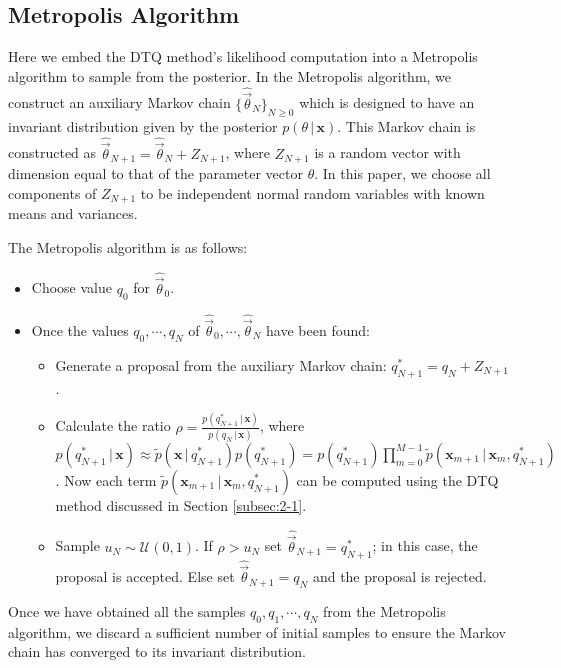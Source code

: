 \documentclass[graybox]{svmult}
\begin{document}
\subsection{Metropolis Algorithm}
\label{subsec:2-2}
Here we embed the DTQ method's likelihood computation into a Metropolis algorithm to sample from the posterior. In the Metropolis algorithm, we construct an auxiliary  Markov chain $\lbrace \hat{\vec{\theta}}_N\rbrace_{N\geq 0}$ which is designed to have an invariant distribution given by the posterior $p(\theta \, | \, \mathbf{x})$. This Markov chain is constructed as $\hat{\vec{\theta}}_{N+1} = \hat{\vec{\theta}}_N + Z_{N+1}$,
where $Z_{N+1}$ is a random vector with dimension equal to that of the parameter vector $\theta$.  In this paper, we choose all components of $Z_{N+1}$ to be independent normal random variables with known means and variances.

The Metropolis algorithm is as follows:
\begin{itemize}
\item Choose value $q_0$ for $\hat{\vec{\theta}}_{0}$.
\item Once the values $q_0, \cdots, q_N$ of $\hat{\vec{\theta}}_{0},\cdots,\hat{\vec{\theta}}_{N}$ have been found:
\begin{itemize}
\item Generate a proposal from the auxiliary Markov chain:
$q_{N+1}^{*} = q_{N} + Z_{N+1}$.
\item Calculate the ratio $\rho = \frac{p(q_{N+1}^{*}  \, | \, \mathbf{x})}{p(q_N \, | \, \mathbf{x})}$, where $p(q_{N+1}^{*}  \, | \, \mathbf{x}) \approx \widetilde{p}(\mathbf{x} \, | \, q_{N+1}^{*}) p(q_{N+1}^{*}) = p(q_{N+1}^{*}) \prod_{m=0}^{M-1} \widetilde{p}(\mathbf{x}_{m+1} \, | \, \mathbf{x}_m, q_{N+1}^{*})$. Now each term $\widetilde{p}(\mathbf{x}_{m+1} \, | \, \mathbf{x}_m, q_{N+1}^{*})$ can be computed using the DTQ method
discussed in Section \ref{subsec:2-1}.
\item Sample $u_N \sim \mathcal{U}(0,1)$.  If $\rho > u_N$ set $\hat{\vec{\theta}}_{N+1} = q_{N+1}^{*}$; in this case, the proposal is accepted. Else set $\hat{\vec{\theta}}_{N+1} = q_{N}$ and the proposal is rejected.
\end{itemize}
\end{itemize}
Once we have obtained all the samples $q_0, q_1, \cdots, q_N$ from the Metropolis algorithm, we discard a sufficient number of initial samples to ensure the Markov chain has converged to its invariant distribution.
\end{document}
